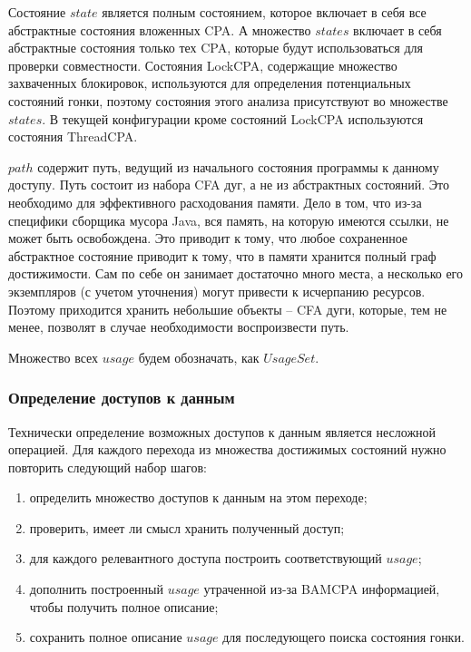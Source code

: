 Состояние $state$ является полным состоянием, которое включает в себя все абстрактные состояния вложенных CPA. 
А множество $states$ включает в себя абстрактные состояния только тех CPA, которые будут использоваться для проверки совместности.
Состояния LockCPA, содержащие множество захваченных блокировок, используются для определения потенциальных состояний гонки, поэтому состояния этого анализа присутствуют во множестве $states$. 
В текущей конфигурации кроме состояний LockCPA используются состояния ThreadCPA. 

$path$ содержит путь, ведущий из начального состояния программы к данному доступу.
Путь состоит из набора CFA дуг, а не из абстрактных состояний. Это необходимо для эффективного расходования памяти.
Дело в том, что из-за специфики сборщика мусора Java, вся память, на которую имеются ссылки, не может быть освобождена.
Это приводит к тому, что любое сохраненное абстрактное состояние приводит к тому, что в памяти хранится полный граф достижимости.
Сам по себе он занимает достаточно много места, а несколько его экземпляров (с учетом уточнения) могут привести к исчерпанию ресурсов.
Поэтому приходится хранить небольшие объекты -- CFA дуги, которые, тем не менее, позволят в случае необходимости воспроизвести путь.

Множество всех $usage$ будем обозначать, как $UsageSet$. 

\subsubsection{Определение доступов к данным}

Технически определение возможных доступов к данным является несложной операцией.
Для каждого перехода из множества достижимых состояний нужно повторить следующий набор шагов:

\begin{enumerate}
\item определить множество доступов к данным на этом переходе;
\item проверить, имеет ли смысл хранить полученный доступ;
\item для каждого релевантного доступа построить соответствующий $usage$;
\item дополнить построенный $usage$ утраченной из-за BAMCPA информацией, чтобы получить полное описание;
\item сохранить полное описание $usage$ для последующего поиска состояния гонки.
\end{enumerate}

